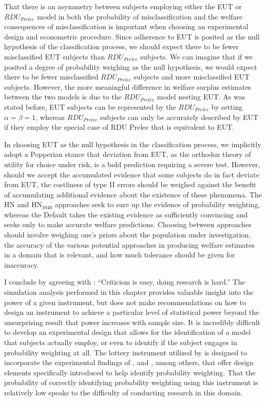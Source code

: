 \documentclass[../main.tex]{subfiles}
\begin{document}
That there is an asymmetry between subjects employing either the EUT or $\mathit{RDU_{Prelec}}$ model in both the probability of misclassification and the welfare consequences of misclassification is important when choosing an experimental design and econometric procedure.
Since adherence to EUT is posited as the null hypothesis of the classification process, we should expect there to be fewer misclassified EUT subjects than $\mathit{RDU_{Prelec}}$ subjects.
We can imagine that if we posited a degree of probability weighing as the null hypothesis, we would expect there to be fewer misclassified $\mathit{RDU_{Prelec}}$ subjects and more misclassified EUT subjects.
However, the more meaningful difference in welfare surplus estimates between the two models is due to the $\mathit{RDU_{Prelec}}$ model nesting EUT.
As was stated before, EUT subjects can be represented by the $\mathit{RDU_{Prelec}}$ by setting $\alpha = \beta = 1$, whereas $\mathit{RDU_{Prelec}}$ subjects can only be accurately described by EUT if they employ the special case of RDU Prelec that is equivalent to EUT.

In choosing EUT as the null hypothesis in the classification process, we implicitly adopt a Popperian stance that deviation from EUT, as the orthodox theory of utility for choice under risk, is a bold prediction requiring a severe test. 
However, should we accept the accumulated evidence that some subjects do in fact deviate from EUT, the costliness of type II errors should be weighed against the benefit of accumulating additional evidence about the existence of these phenomena.
The HN and $\text{HN}_{1040}$ approaches seek to sure up the evidence of probability weighting, whereas the Default takes the existing evidence as sufficiently convincing and seeks only to make accurate welfare predictions. 
Choosing between approaches should involve weighing one’s priors about the population under investigation, the accuracy of the various potential approaches in producing welfare estimates in a domain that is relevant, and how much tolerance should be given for inaccuracy. 

I conclude by agreeing with \textcite[14]{Gelman2013}: \enquote{Criticism is easy, doing research is hard.}
The simulation analysis performed in this chapter provides valuable insight into the power of a given instrument, but does not make recommendations on how to design an instrument to achieve a particular level of statistical power beyond the unsurprising result that power increases with sample size.
It is incredibly difficult to develop an experimental design that allows for the identification of a model that subjects actually employ, or even to identify if the subject engages in probability weighting at all.
The lottery instrument utilized by \textcite[98-99]{Harrison2016} is designed to incorporate the experimental findings of \textcite{Camerer1989}, \textcite{Harless1992} and \textcite{Loomes1998}, among others, that offer design elements specifically introduced to help identify probability weighting.
That the probability of correctly identifying probability weighting using this instrument is relatively low speaks to the difficulty of conducting research in this domain.

\onlyinsubfile{
\newpage
\printbibliography[segment=4, heading=subbibliography]
}
\end{document}
